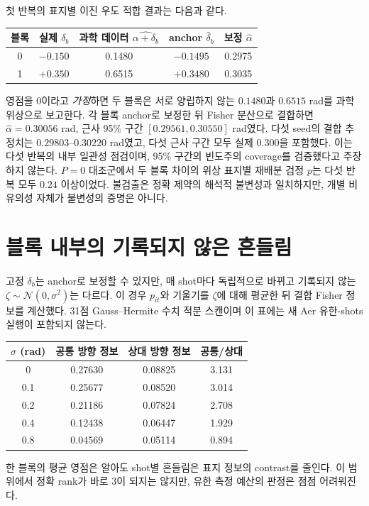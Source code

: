 \documentclass[11pt,a4paper]{article}
\begin{document}
첫 반복의 표지별 이진 우도 적합 결과는 다음과 같다.
\begin{center}
\begin{tabular}{@{}ccccc@{}}
\toprule
블록 & 실제 $\delta_b$ & 과학 데이터 $\widehat{\alpha+\delta_b}$
& anchor $\hat\delta_b$ & 보정 $\hat\alpha$ \\
\midrule
0 & $-0.150$ & 0.1480 & $-0.1495$ & 0.2975 \\
1 & $+0.350$ & 0.6515 & $+0.3480$ & 0.3035 \\
\bottomrule
\end{tabular}
\end{center}
영점을 0이라고 \emph{가정}하면 두 블록은 서로 양립하지 않는
$0.1480$과 $0.6515$ rad를 과학 위상으로 보고한다.
각 블록 anchor로 보정한 뒤 Fisher 분산으로 결합하면
$\hat\alpha=0.30056$ rad, 근사 95\% 구간
$[0.29561,0.30550]$ rad였다. 다섯 seed의 결합 추정치는
$0.29803$--$0.30220$ rad였고, 다섯 근사 구간 모두 실제
$0.300$을 포함했다. 이는 다섯 반복의 내부 일관성 점검이며,
95\% 구간의 빈도주의 coverage를 검증했다고 주장하지 않는다.
$P=0$ 대조군에서 두 블록 차이의 위상 표지별 재배분 검정
$p$는 다섯 반복 모두 $0.24$ 이상이었다. 불검출은 정확
제약의 해석적 불변성과 일치하지만, 개별 비유의성 자체가
불변성의 증명은 아니다.

\section{블록 내부의 기록되지 않은 흔들림}
고정 $\delta_b$는 anchor로 보정할 수 있지만, 매 shot마다
독립적으로 바뀌고 기록되지 않는
$\zeta\sim\mathcal N(0,\sigma^2)$는 다르다. 이 경우
$p_{it}$와 기울기를 $\zeta$에 대해 평균한 뒤 결합 Fisher
정보를 계산했다. 31점 Gauss--Hermite 수치 적분 스캔이며
이 표에는 새 Aer 유한-shots 실행이 포함되지 않는다.
\begin{center}
\begin{tabular}{@{}cccc@{}}
\toprule
$\sigma$ (rad) & 공통 방향 정보 & 상대 방향 정보 & 공통/상대 \\
\midrule
0 & 0.27630 & 0.08825 & 3.131 \\
0.1 & 0.25677 & 0.08520 & 3.014 \\
0.2 & 0.21186 & 0.07824 & 2.708 \\
0.4 & 0.12438 & 0.06447 & 1.929 \\
0.8 & 0.04569 & 0.05114 & 0.894 \\
\bottomrule
\end{tabular}
\end{center}
한 블록의 평균 영점은 알아도 shot별 흔들림은 표지 정보의
contrast를 줄인다. 이 범위에서 정확 rank가 바로 3이 되지는
않지만, 유한 측정 예산의 판정은 점점 어려워진다.
\end{document}
